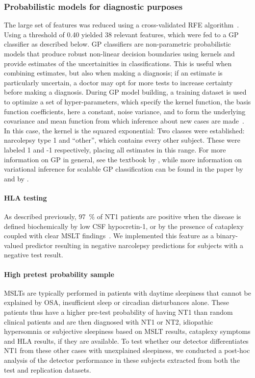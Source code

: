 \subsubsection{Probabilistic models for diagnostic purposes} 
The large set of features was reduced using a cross-validated \ac{RFE} algorithm~\cite{Guyon2002}.
Using a threshold of 0.40 yielded 38 relevant features, which were fed to a \ac{GP} classifier as described below.
GP classifiers are non-parametric probabilistic models that produce robust non-linear decision boundaries using kernels and provide estimates of the uncertainities in classifications.
This is useful when combining estimates, but also when making a diagnosis; if an estimate is particularly uncertain, a doctor may opt for more tests to increase certainty before making a diagnosis.
During \ac{GP} model building, a training dataset is used to optimize a set of hyper-parameters, which specify the kernel function, the basis function coefficients, here a constant, noise variance, and to form the underlying covariance and mean function from which inference about new cases are made~\cite{Rasmussen2006}.
In this case, the kernel is the squared exponential:
Two classes were established: narcolepsy type 1 and “other”, which contains every other subject.
These were labeled 1 and -1 respectively, placing all estimates in this range.
For more information on GP in general, see the textbook by \citeauthor{Rasmussen2006}\cite{Rasmussen2006}, while more information on variational inference for scalable \ac{GP} classification can be found in the paper by \citeauthor{Hensman2015}\cite{Hensman2015} and by \citeauthor{Matthews2017}\cite{Matthews2017}.

\paragraph{HLA testing}
As described previously, \SI{97}{\percent} of \ac{NT1} patients are \hla positive when the disease is defined biochemically by low \ac{CSF} hypocretin-1, or by the presence of cataplexy coupled with clear \ac{MSLT} findings~\cite{Han2014,Andlauer2013}. 
We implemented this feature as a binary-valued predictor resulting in negative narcolepsy predictions for subjects with a negative \hla test result.

\paragraph{High pretest probability sample}
\Acp{MSLT} are typically performed in patients with daytime sleepiness that cannot be explained by \ac{OSA}, insufficient sleep or circadian disturbances alone. 
These patients thus have a higher pre-test probability of having \ac{NT1} than random clinical patients and are then diagnosed with \ac{NT1} or \ac{NT2}, idiopathic hypersomnia or subjective sleepiness based on \ac{MSLT} results, cataplexy symptoms and \ac{HLA} results, if they are available.
To test whether our detector differentiates \ac{NT1} from these other cases with unexplained sleepiness, we conducted a post-hoc analysis of the detector performance in these subjects extracted from both the test and replication datasets.

